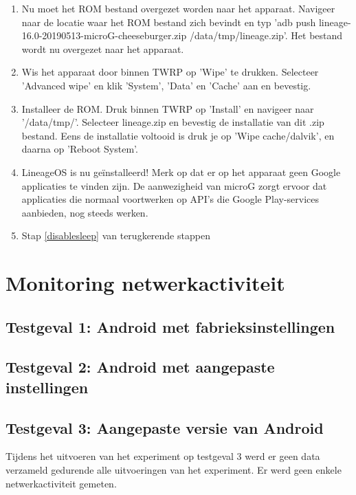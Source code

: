 \begin{enumerate}
    \item Nu moet het ROM bestand overgezet worden naar het apparaat. Navigeer naar de locatie waar het ROM bestand zich bevindt en typ 'adb push lineage-16.0-20190513-microG-cheeseburger.zip /data/tmp/lineage.zip'. Het bestand wordt nu overgezet naar het apparaat.
    \item Wis het apparaat door binnen TWRP op 'Wipe' te drukken. Selecteer 'Advanced wipe' en klik 'System', 'Data' en 'Cache' aan en bevestig.
    \item Installeer de ROM. Druk binnen TWRP op 'Install' en navigeer naar '/data/tmp/'. Selecteer lineage.zip en bevestig de installatie van dit .zip bestand. Eens de installatie voltooid is druk je op 'Wipe cache/dalvik', en daarna op 'Reboot System'.
    \item 
    LineageOS is nu geïnstalleerd! Merk op dat er op het apparaat geen Google applicaties te vinden zijn. De aanwezigheid van microG zorgt ervoor dat applicaties die normaal voortwerken op API's die Google Play-services aanbieden, nog steeds werken.
    \item Stap \ref{disablesleep} van terugkerende stappen
\end{enumerate}

\section{Monitoring netwerkactiviteit}

\subsection{Testgeval 1: Android met fabrieksinstellingen}

\subsection{Testgeval 2: Android met aangepaste instellingen}

\subsection{Testgeval 3: Aangepaste versie van Android}
Tijdens het uitvoeren van het experiment op testgeval 3 werd er geen data verzameld gedurende alle uitvoeringen van het experiment. Er werd geen enkele netwerkactiviteit gemeten.